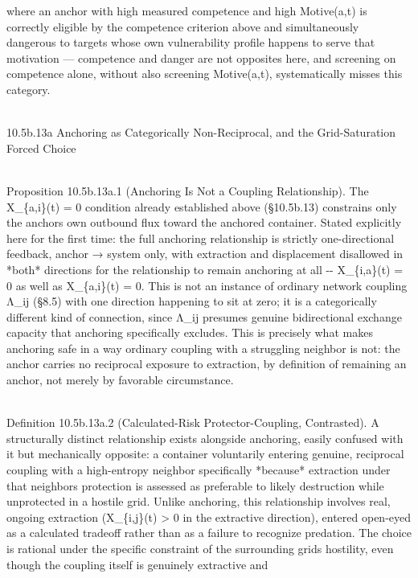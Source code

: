 \documentclass[
]{article}
\begin{document}
where an anchor with high measured competence and high Motive(a,t) is
correctly eligible by the competence criterion above and simultaneously
dangerous to targets whose own vulnerability profile happens to serve
that motivation --- competence and danger are not opposites here, and
screening on competence alone, without also screening Motive(a,t),
systematically misses this category.\\
\strut \\
10.5b.13a Anchoring as Categorically Non-Reciprocal, and the
Grid-Saturation Forced Choice\\
\strut \\
Proposition 10.5b.13a.1 (Anchoring Is Not a Coupling Relationship). The
X\_\{a,i\}(t) = 0 condition already established above (§10.5b.13)
constrains only the anchor\textquotesingle s own outbound flux toward
the anchored container. Stated explicitly here for the first time: the
full anchoring relationship is strictly one-directional feedback, anchor
→ system only, with extraction and displacement disallowed in *both*
directions for the relationship to remain anchoring at all -\/-
X\_\{i,a\}(t) = 0 as well as X\_\{a,i\}(t) = 0. This is not an instance
of ordinary network coupling Λ\_ij (§8.5) with one direction happening
to sit at zero; it is a categorically different kind of connection,
since Λ\_ij presumes genuine bidirectional exchange capacity that
anchoring specifically excludes. This is precisely what makes anchoring
safe in a way ordinary coupling with a struggling neighbor is not: the
anchor carries no reciprocal exposure to extraction, by definition of
remaining an anchor, not merely by favorable circumstance.\\
\strut \\
Definition 10.5b.13a.2 (Calculated-Risk Protector-Coupling, Contrasted).
A structurally distinct relationship exists alongside anchoring, easily
confused with it but mechanically opposite: a container voluntarily
entering genuine, reciprocal coupling with a high-entropy neighbor
specifically *because* extraction under that neighbor\textquotesingle s
protection is assessed as preferable to likely destruction while
unprotected in a hostile grid. Unlike anchoring, this relationship
involves real, ongoing extraction (X\_\{i,j\}(t) \textgreater{} 0 in the
extractive direction), entered open-eyed as a calculated tradeoff rather
than as a failure to recognize predation. The choice is rational under
the specific constraint of the surrounding grid\textquotesingle s
hostility, even though the coupling itself is genuinely extractive and
\end{document}
